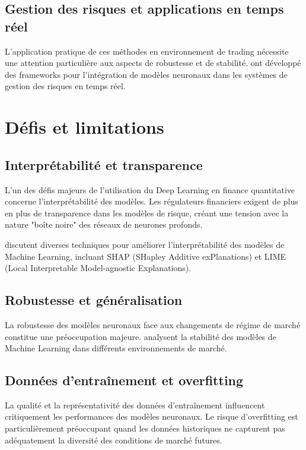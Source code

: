 \subsection{Gestion des risques et applications en temps réel}

L'application pratique de ces méthodes en environnement de trading nécessite une attention particulière aux aspects de robustesse et de stabilité. \citet{ruf2020neural} ont développé des frameworks pour l'intégration de modèles neuronaux dans les systèmes de gestion des risques en temps réel.

\section{Défis et limitations}

\subsection{Interprétabilité et transparence}

L'un des défis majeurs de l'utilisation du Deep Learning en finance quantitative concerne l'interprétabilité des modèles. Les régulateurs financiers exigent de plus en plus de transparence dans les modèles de risque, créant une tension avec la nature "boîte noire" des réseaux de neurones profonds.

\citet{molnar2020interpretable} discutent diverses techniques pour améliorer l'interprétabilité des modèles de Machine Learning, incluant SHAP (SHapley Additive exPlanations) et LIME (Local Interpretable Model-agnostic Explanations).

\subsection{Robustesse et généralisation}

La robustesse des modèles neuronaux face aux changements de régime de marché constitue une préoccupation majeure. \citet{cont2020robustness} analysent la stabilité des modèles de Machine Learning dans différents environnements de marché.

\subsection{Données d'entraînement et overfitting}

La qualité et la représentativité des données d'entraînement influencent critiquement les performances des modèles neuronaux. Le risque d'overfitting est particulièrement préoccupant quand les données historiques ne capturent pas adéquatement la diversité des conditions de marché futures.

